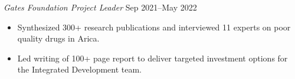 \textit{Gates Foundation Project Leader} \hfill Sep 2021--May 2022
\begin{itemize}
	\item Synthesized 300+ research publications and interviewed 11 experts on poor quality drugs in Arica.
	\item Led writing of 100+ page report to deliver targeted investment options for the Integrated Development team.
\end{itemize}\par